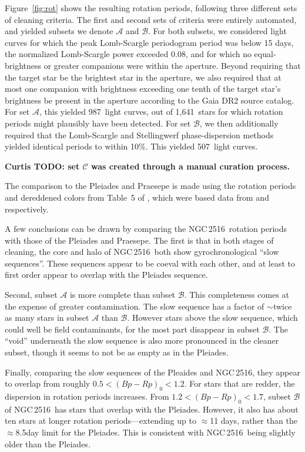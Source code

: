 \documentclass[12pt,twocolumn,tighten]{aastex63}
\newcommand{\cn}{NGC\,2516} %
\newcommand{\nautorotdenominator}{1{,}641\ } %
\newcommand{\nautorotnumerator}{987\ } %
\newcommand{\nautorotnumeratormatching}{507\ } %
\begin{document}
Figure~\ref{fig:rot} shows the resulting rotation periods, following
three different sets of cleaning criteria.  The first and second sets
of criteria were entirely automated, and yielded subsets we denote
$\mathcal{A}$ and $\mathcal{B}$.  For both subsets, we considered
light curves for which the peak Lomb-Scargle periodogram period was
below 15 days, the normalized Lomb-Scargle power exceeded 0.08, and
for which no equal-brightness or greater companions were within the
aperture.  Beyond requiring that the target star be the brightest star
in the aperture, we also required that at most one companion with
brightness exceeding one tenth of the target star's brightness be
present in the aperture according to the Gaia DR2 source catalog.  For
set $\mathcal{A}$, this yielded \nautorotnumerator light curves,
out of \nautorotdenominator stars for which rotation periods might
plausibly have been detected.  For set $\mathcal{B}$, we
then additionally required that the Lomb-Scargle and Stellingwerf
phase-dispersion methods yielded identical periods to within 10\%.
This yielded \nautorotnumeratormatching light curves. 

{\bf Curtis TODO: set $\mathcal{C}$ was created through a manual
curation process.}

The comparison to the Pleiades and Praesepe is made using the rotation
periods and dereddened colors from Table~5 of \citet{curtis_rup147_2020}, which
were based data from \citet{rebull_rotation_2016a} and
\citet{douglas_k2_2019} respectively.

A few conclusions can be drawn by comparing the \cn\ rotation periods
with those of the Pleiades and Praesepe.  The first is that in both
stages of cleaning, the core and halo of \cn\ both show
gyrochronological ``slow sequences''.  These sequences appear to be
coeval with each other, and at least to first order appear to overlap
with the Pleiades sequence.

Second, subset $\mathcal{A}$ is more complete than subset
$\mathcal{B}$.  This completeness comes at the expense of greater
contamination.  The slow sequence has a factor of $\sim$twice as many
stars in subset $\mathcal{A}$ than $\mathcal{B}$.  However stars above
the slow sequence, which could well be field contaminants, for the
most part disappear in subset $\mathcal{B}$.  The ``void'' underneath
the slow sequence is also more pronounced in the cleaner subset,
though it seems to not be as empty as in the Pleiades.

Finally, comparing the slow sequences of the Pleaides and \cn, they
appear to overlap from roughly $0.5<(Bp-Rp)_0<1.2$.  For stars that
are redder, the dispersion in rotation periods increases.  From
$1.2<(Bp-Rp)_0<1.7$, subset $\mathcal{B}$ of \cn\ has stars that
overlap with the Pleiades.  However, it also has about ten stars at
longer rotation periods---extending up to $\approx$11 days, rather
than the $\approx$8.5day limit for the Pleiades.  This is consistent
with \cn\ being slightly older than the Pleiades.
\end{document}
